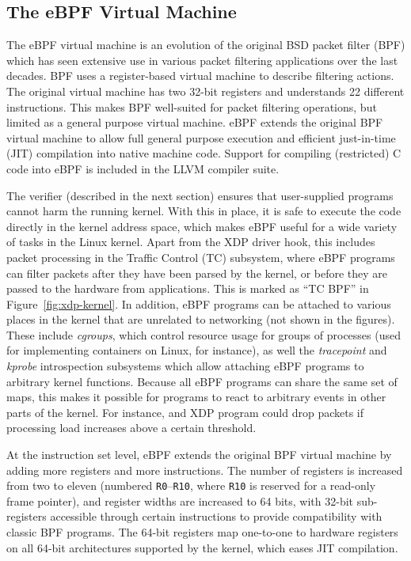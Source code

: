 \documentclass[10pt,sigconf]{acmart}
\begin{document}
\subsection{The eBPF Virtual Machine}
\label{sec:bpf-vm}
The eBPF virtual machine is an evolution of the original BSD packet filter (BPF)
\cite{mccanne_bsd_1993} which has seen extensive use in various packet filtering
applications over the last decades. BPF uses a register-based virtual machine to
describe filtering actions. The original virtual machine has two 32-bit registers and
understands 22 different instructions. This makes BPF well-suited for packet
filtering operations, but limited as a general purpose virtual machine. eBPF
extends the original BPF virtual machine to allow full general purpose execution
and efficient just-in-time (JIT) compilation into native machine code. Support
for compiling (restricted) C code into eBPF is included in the LLVM compiler
suite.

The verifier (described in the next section) ensures that user-supplied programs
cannot harm the running kernel. With this in place, it is safe to execute the
code directly in the kernel address space, which makes eBPF useful for a wide
variety of tasks in the Linux kernel. Apart from the XDP driver hook, this
includes packet processing in the Traffic Control (TC) subsystem, where eBPF
programs can filter packets after they have been parsed by the kernel, or before
they are passed to the hardware from applications. This is marked as ``TC BPF''
in Figure~\ref{fig:xdp-kernel}. In addition, eBPF programs can be attached to
various places in the kernel that are unrelated to networking (not shown in the
figures). These include \emph{cgroups}, which control resource usage for groups
of processes (used for implementing containers on Linux, for instance), as well
the \emph{tracepoint} and \emph{kprobe} introspection subsystems which allow
attaching eBPF programs to arbitrary kernel functions. Because all eBPF programs
can share the same set of maps, this makes it possible for programs to react to
arbitrary events in other parts of the kernel. For instance, and XDP program
could drop packets if processing load increases above a certain threshold.

At the instruction set level, eBPF extends the original BPF virtual machine by
adding more registers and more instructions. The number of registers is
increased from two to eleven (numbered \texttt{R0}--\texttt{R10}, where
\texttt{R10} is reserved for a read-only frame pointer), and register widths are
increased to 64 bits, with 32-bit sub-registers accessible through certain
instructions to provide compatibility with classic BPF programs. The 64-bit
registers map one-to-one to hardware registers on all 64-bit architectures
supported by the kernel, which eases JIT compilation.
\end{document}
